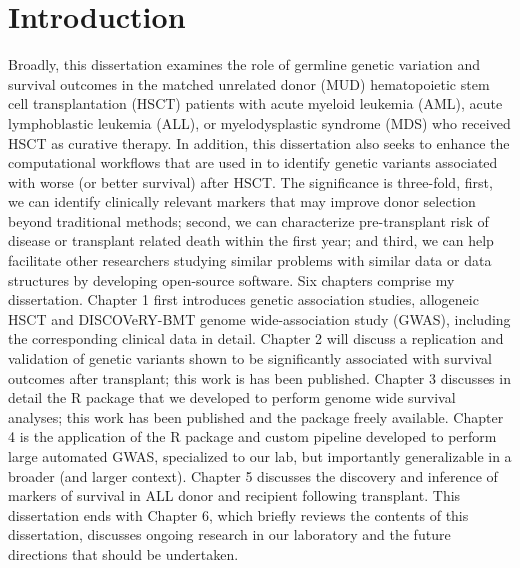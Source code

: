 \documentclass[]{DissertateOSU}
\begin{document}
\newpage

\pagestyle{plain} \fancyhead[L]{} \fancyhead[R]{}
\fancyfoot[C]{\thepage} \tableofcontents

\newpage

\pagestyle{plain} \fancyhead[L]{} \fancyhead[R]{}
\fancyfoot[C]{\thepage} \listoftables

\newpage

\pagestyle{plain} \fancyhead[L]{} \fancyhead[R]{}
\fancyfoot[C]{\thepage} \listoffigures

\newpage


\newpage

\pagestyle{plain} \fancyhead[L]{} \fancyhead[R]{}
\fancyfoot[C]{\thepage} \chapter{Introduction} \doublespacing

Broadly, this dissertation examines the role of germline genetic
variation and survival outcomes in the matched unrelated donor (MUD)
hematopoietic stem cell transplantation (HSCT) patients with acute
myeloid leukemia (AML), acute lymphoblastic leukemia (ALL), or
myelodysplastic syndrome (MDS) who received HSCT as curative therapy. In
addition, this dissertation also seeks to enhance the computational
workflows that are used in to identify genetic variants associated with
worse (or better survival) after HSCT. The significance is three-fold,
first, we can identify clinically relevant markers that may improve
donor selection beyond traditional methods; second, we can characterize
pre-transplant risk of disease or transplant related death within the
first year; and third, we can help facilitate other researchers studying
similar problems with similar data or data structures by developing
open-source software. Six chapters comprise my dissertation. Chapter 1
first introduces genetic association studies, allogeneic HSCT and
DISCOVeRY-BMT genome wide-association study (GWAS), including the
corresponding clinical data in detail. Chapter 2 will discuss a
replication and validation of genetic variants shown to be significantly
associated with survival outcomes after transplant; this work is has
been published. Chapter 3 discusses in detail the R package that we
developed to perform genome wide survival analyses; this work has been
published and the package freely available. Chapter 4 is the application
of the R package and custom pipeline developed to perform large
automated GWAS, specialized to our lab, but importantly generalizable in
a broader (and larger context). Chapter 5 discusses the discovery and
inference of markers of survival in ALL donor and recipient following
transplant. This dissertation ends with Chapter 6, which briefly reviews
the contents of this dissertation, discusses ongoing research in our
laboratory and the future directions that should be undertaken.
\end{document}
